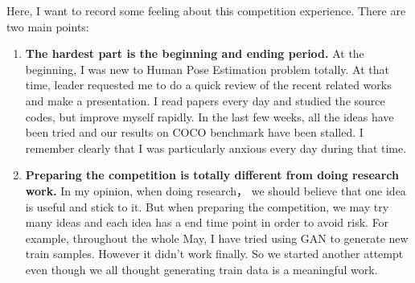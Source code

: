 Here, I want to record some feeling about this competition experience.
There are two main points:
\begin{enumerate}
  \item \textbf{The hardest part is the beginning and ending period.} At the beginning, I was new to Human Pose Estimation problem totally.
  At that time, leader requested me to do a quick review of the recent related works and make a presentation.
  I read papers every day and studied the source codes, but improve myself rapidly.
  In the last few weeks, all the ideas have been tried and our results on COCO benchmark have been stalled.
  I remember clearly that I was particularly anxious every day during that time.
  \item \textbf{Preparing the competition is totally different from doing research work.}
  In my opinion, when doing research， we should believe that one idea is useful and stick to it.
  But when preparing the competition, we may try many ideas and each idea has a end time point in order to avoid risk.
  For example, throughout the whole May, I have tried using GAN to generate new train samples. However it didn't work finally.
  So we started another attempt even though we all thought generating train data is a meaningful work. 
\end{enumerate}


